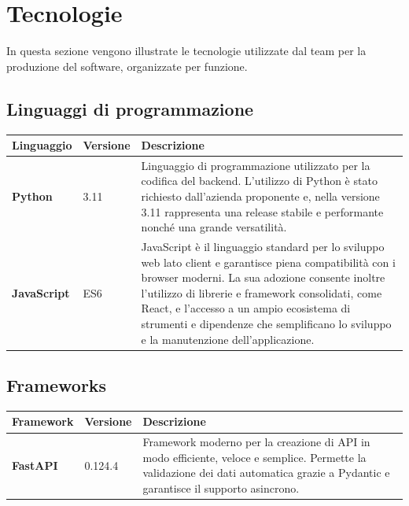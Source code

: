 \documentclass[a4paper,12pt]{article}
\begin{document}
    \newpage

    \section{Tecnologie}
    In questa sezione vengono illustrate le tecnologie utilizzate dal team per la produzione del software, organizzate per funzione.

        \subsection{Linguaggi di programmazione}
        \begin{center}
            \begin{tabularx}{\textwidth}{|l|l|X|}
                \hline
                \rowcolor{gold}
                \textbf{Linguaggio}  & \textbf{Versione}       & \textbf{Descrizione}                                          \\
                \hline
                \textbf{Python} & 3.11 & Linguaggio di programmazione utilizzato per la codifica del backend. L'utilizzo di Python è stato richiesto dall'azienda proponente e, nella versione 3.11 rappresenta una release stabile e performante nonché una grande versatilità.\\
                \hline
                \textbf{JavaScript} & ES6 & JavaScript è il linguaggio standard per lo sviluppo web lato client e garantisce piena compatibilità con i browser moderni. La sua adozione consente inoltre l'utilizzo di librerie e framework consolidati, come React, e l'accesso a un ampio ecosistema di strumenti e dipendenze che semplificano lo sviluppo e la manutenzione dell'applicazione.\\
                \hline
            \end{tabularx}
        \end{center}

        \subsection{Frameworks}
        \begin{center}
            \begin{tabularx}{\textwidth}{|l|l|X|}
                \hline
                \rowcolor{gold}
                \textbf{Framework}  & \textbf{Versione}  & \textbf{Descrizione}   \\
                \hline
                \textbf{FastAPI} & 0.124.4 & Framework moderno per la creazione di API in modo efficiente, veloce e semplice. Permette la validazione dei dati automatica grazie a Pydantic e garantisce il supporto asincrono.\\
                \hline
            \end{tabularx}
        \end{center}
\end{document}
